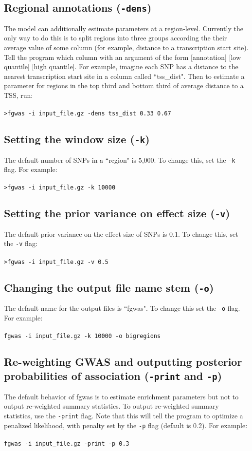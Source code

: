 \documentclass[11pt,titlepage]{article}
\begin{document}
\subsection{Regional annotations (\texttt{-dens})}
The model can additionally estimate parameters at a region-level. Currently the only way to do this is to split regions into three groups according the their average value of some column (for example, distance to a transcription start site). Tell the program which column with an argument of the form [annotation] [low quantile] [high quantile]. For example, imagine each SNP has a distance to the nearest transcription start site in a column called ``tss\_dist". Then to estimate a parameter for regions in the top third and bottom third of average distance to a TSS, run:
\\
\\
\noindent \texttt{>fgwas -i input\_file.gz -dens tss\_dist 0.33 0.67}

\subsection{Setting the window size (\texttt{-k})}
The default number of SNPs in a ``region" is 5,000. To change this, set the \texttt{-k} flag. For example:
\\
\\
\noindent \texttt{>fgwas -i input\_file.gz -k 10000}\\

\subsection{Setting the prior variance on effect size (\texttt{-v})}
The default prior variance on the effect size of SNPs is 0.1. To change this, set the \texttt{-v} flag:
\\
\\
\noindent \texttt{>fgwas -i input\_file.gz -v 0.5}\\

\subsection{Changing the output file name stem (\texttt{-o})}
The default name for the output files is ``fgwas". To change this set the \texttt{-o} flag. For example:
\\
\\
\texttt{fgwas -i input\_file.gz -k 10000 -o bigregions}

\subsection{Re-weighting GWAS and outputting posterior probabilities of association (\texttt{-print} and \texttt{-p})}
The default behavior of fgwas is to estimate enrichment parameters but not to output re-weighted summary statistics. To output re-weighted summary statistics, use the \texttt{-print} flag. Note that this will tell the program to optimize a penalized likelihood, with penalty set by the \texttt{-p} flag (default is 0.2). For example:
\\
\\
\texttt{fgwas -i input\_file.gz -print -p 0.3}
\end{document}
